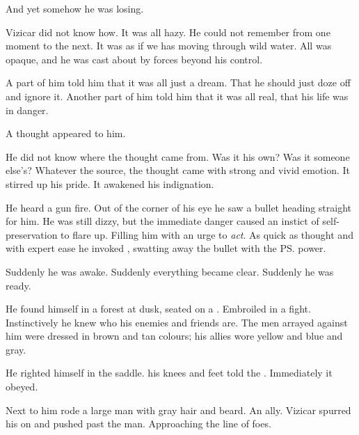 And yet somehow he was losing. 

Vizicar did not know how. 
It was all hazy. 
He could not remember from one moment to the next. 
It was as if we has moving through wild water. 
All was opaque, and he was cast about by forces beyond his control. 

A part of him told him that it was all just a dream. 
That he should just doze off and ignore it. 
Another part of him told him that it was all real, that his life was in danger. 

A thought appeared to him. 


He did not know where the thought came from. 
Was it his own? 
Was it someone else's? 
Whatever the source, the thought came with strong and vivid emotion. 
It stirred up his pride. 
It awakened his indignation. 



He heard a gun fire. 
Out of the corner of his eye he saw a bullet heading straight for him. 
He was still dizzy, but the immediate danger caused an instict of self-preservation to flare up. 
Filling him with an urge to \emph{act}. 
As quick as thought and with expert ease he invoked , swatting away the bullet with the \ps{\sephirah} power. 

Suddenly he was awake. 
Suddenly everything became clear. 
Suddenly he was ready. 

He found himself in a forest at dusk, seated on a \relc. 
Embroiled in a fight. 
Instinctively he knew who his enemies and friends are. 
The men arrayed against him were dressed in brown and tan colours; his allies wore yellow and blue and gray. 

He righted himself in the saddle. 
 his knees and feet told the \relc. 
Immediately it obeyed. 

Next to him rode a large man with gray hair and beard. 
An ally. 
Vizicar spurred his \relc{} on and pushed past the man. 
Approaching the line of foes. 

